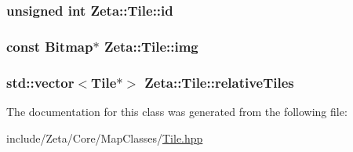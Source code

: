 \hypertarget{classZeta_1_1Tile_a73e4f7fc4c4770d3dd4ddd823f168944}{
\subsubsection[{id}]{\setlength{\rightskip}{0pt plus 5cm}unsigned int Zeta\+::\+Tile\+::id\hspace{0.3cm}{\ttfamily [protected]}}}\label{classZeta_1_1Tile_a73e4f7fc4c4770d3dd4ddd823f168944}
\hypertarget{classZeta_1_1Tile_a07ecd5534c5706c34caa24b76d1f7732}{
\subsubsection[{img}]{\setlength{\rightskip}{0pt plus 5cm}const {\bf Bitmap}$\ast$ Zeta\+::\+Tile\+::img\hspace{0.3cm}{\ttfamily [protected]}}}\label{classZeta_1_1Tile_a07ecd5534c5706c34caa24b76d1f7732}
\hypertarget{classZeta_1_1Tile_a87ad7f87310b4f614a91027f2eb80ac6}{
\subsubsection[{relative\+Tiles}]{\setlength{\rightskip}{0pt plus 5cm}std\+::vector$<${\bf Tile}$\ast$$>$ Zeta\+::\+Tile\+::relative\+Tiles\hspace{0.3cm}{\ttfamily [protected]}}}\label{classZeta_1_1Tile_a87ad7f87310b4f614a91027f2eb80ac6}


The documentation for this class was generated from the following file\+:\begin{DoxyCompactItemize}
\item 
include/\+Zeta/\+Core/\+Map\+Classes/\hyperlink{Tile_8hpp}{Tile.\+hpp}\end{DoxyCompactItemize}
